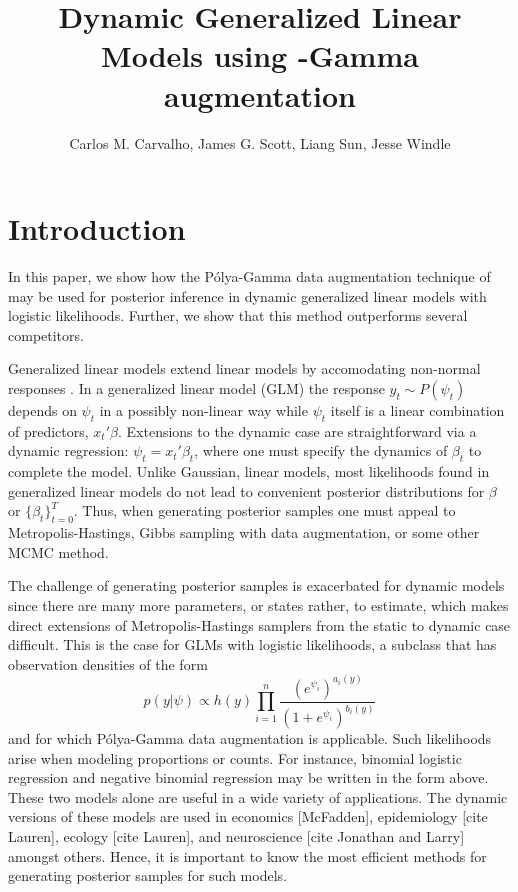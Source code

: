 \documentclass[11pt]{article}
\title{Dynamic Generalized Linear Models using \Polya-Gamma augmentation}
\author{Carlos M. Carvalho, James G. Scott, Liang Sun, Jesse Windle}
\newcommand{\Polya}{P\'{o}lya}
\begin{document}
\maketitle
\tableofcontents

\newpage

\section{Introduction}

In this paper, we show how the \Polya-Gamma data augmentation technique of
\cite{polson-etal-2012} may be used for posterior inference in dynamic
generalized linear models with logistic likelihoods.  Further, we show that this
method outperforms several competitors.

Generalized linear models extend linear models by accomodating non-normal
responses \citep{mccullagh-nelder-1989}.  In a generalized linear model (GLM)
the response $y_t \sim P(\psi_t)$ depends on $\psi_t$ in a possibly non-linear
way while $\psi_t$ itself is a linear combination of predictors, $x_t' \beta$.
Extensions to the dynamic case are straightforward via a dynamic regression:
$\psi_t = x_t' \beta_t$, where one must specify the dynamics of $\beta_t$ to
complete the model.  Unlike Gaussian, linear models, most likelihoods found in
generalized linear models do not lead to convenient posterior distributions for
$\beta$ or $\{\beta_t\}_{t=0}^T$.  Thus, when generating posterior samples one
must appeal to Metropolis-Hastings, Gibbs sampling with data augmentation, or
some other MCMC method.

The challenge of generating posterior samples is exacerbated for dynamic models
since there are many more parameters, or states rather, to estimate, which makes
direct extensions of Metropolis-Hastings samplers from the static to dynamic
case difficult.  This is the case for GLMs with logistic likelihoods, a subclass
that has observation densities of the form
\[
p(y | \psi) \propto h(y) \prod_{i=1}^n
\frac{(e^{\psi_i})^{a_i(y)}}{(1+e^{\psi_i})^{b_i(y)}}
\]
and for which \Polya-Gamma data augmentation is applicable.  Such likelihoods
arise when modeling proportions or counts.  For instance, binomial logistic
regression and negative binomial regression may be written in the form above.
These two models alone are useful in a wide variety of applications.  The
dynamic versions of these models are used in economics [McFadden], epidemiology
[cite Lauren], ecology [cite Lauren], and neuroscience [cite Jonathan and Larry]
amongst others.  Hence, it is important to know the most efficient methods for
generating posterior samples for such models.
\end{document}
